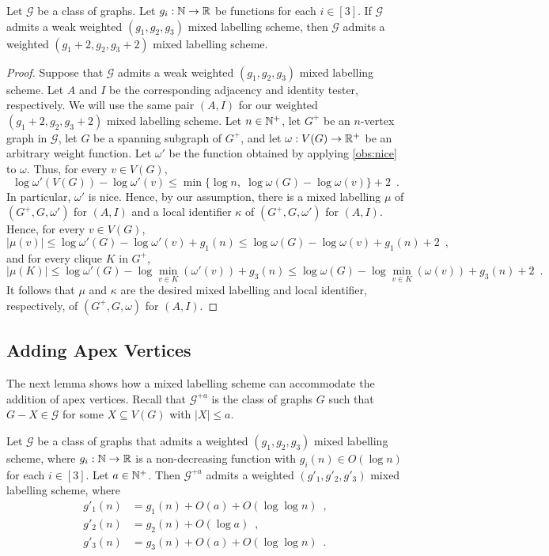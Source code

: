 \documentclass{patmorin}
\renewcommand{\le}{\leqslant}
\renewcommand{\leq}{\leqslant}
\newcommand{\Oh}{O}
\newcommand{\calG}{\mathcal{G}}
\begin{document}
\begin{lem}
  \label{lem:nice_weights}
  Let $\calG$ be a class of graphs.
  Let $g_i:\mathbb{N}\to\mathbb{R}$ be functions for each $i\in[3]$.
  If $\calG$ admits a weak weighted $(g_1,g_2,g_3)$ mixed labelling scheme, then $\calG$ admits a weighted $(g_1+2,g_2,g_3+2)$ mixed labelling scheme.
\end{lem}
\begin{proof}
  Suppose that $\calG$ admits a weak weighted $(g_1,g_2,g_3)$ mixed labelling scheme.
  Let $A$ and $I$ be the corresponding adjacency and identity tester, respectively.
  We will use the same pair $(A, I)$ for our weighted $(g_1+2,g_2,g_3+2)$ mixed labelling scheme.
  Let $n\in \mathbb{N}^+$, let $G^+$ be an $n$-vertex graph in $\calG$, let $G$ be a spanning subgraph of $G^+$, and let $\omega:V(G)\to \mathbb{R}^+$ be an arbitrary weight function.
  Let $\omega'$ be the function obtained by applying \cref{obs:nice} to $\omega$.
  Thus, for every $v\in V(G)$,
  \[
    \log\omega'(V(G))-\log\omega'(v)\le\min\{\log n,\;\log\omega(G)-\log\omega(v)\}+2 \enspace.
  \]
  In particular, $\omega'$ is nice.
  Hence, by our assumption, there is a mixed labelling $\mu$ of $(G^+,G,\omega')$ for $(A,I)$ and a local identifier $\kappa$ of $(G^+,G,\omega')$ for $(A,I)$.
  Hence, for every $v\in V(G)$,
  \[
    |\mu(v)| \leq \log \omega'(G) - \log\omega'(v) + g_1(n) \leq \log \omega(G) - \log\omega(v) + g_1(n) + 2\enspace,
  \]
  and  for every clique $K$ in $G^+$,
  \[
    |\mu(K)|\le \log \omega'(G) - \log\min_{v\in K}(\omega'(v)) + g_3(n)
    \leq \log \omega(G) - \log\min_{v\in K}(\omega(v)) + g_3(n) + 2\enspace.
  \]
  It follows that $\mu$ and  $\kappa$ are the desired  mixed labelling and local identifier, respectively,  of $(G^+,G,\omega)$ for $(A,I)$.
\end{proof}

\subsection{Adding Apex Vertices}
\label{sec:adding_apexes}

The next lemma shows how a mixed labelling scheme can accommodate the addition of apex vertices. Recall that $\calG^{+a}$ is the class of graphs $G$ such that $G-X\in\calG$ for some $X\subseteq V(G)$ with $|X|\leq a$.

\begin{lem}\label{add_apexes}
  Let $\calG$ be a class of graphs that admits a weighted $(g_1,g_2,g_3)$ mixed labelling scheme, where $g_i:\mathbb{N}\to\mathbb{R}$ is a non-decreasing function  with $g_i(n)\in \Oh(\log n)$ for each $i\in[3]$.
  Let $a\in\mathbb{N}^+$. Then $\calG^{+a}$ admits a weighted $(g'_1,g'_2,g'_3)$ mixed labelling scheme, where
  \begin{align*}
    g'_1(n)
     & = g_1(n)+\Oh(a)+\Oh(\log\log n) \enspace,  \\
    g'_2(n)
     & = g_2(n)+\Oh(\log a) \enspace,             \\
    g'_3(n)
     & = g_3(n)+\Oh(a)+\Oh(\log\log n) \enspace .
  \end{align*}
\end{lem}
\end{document}
